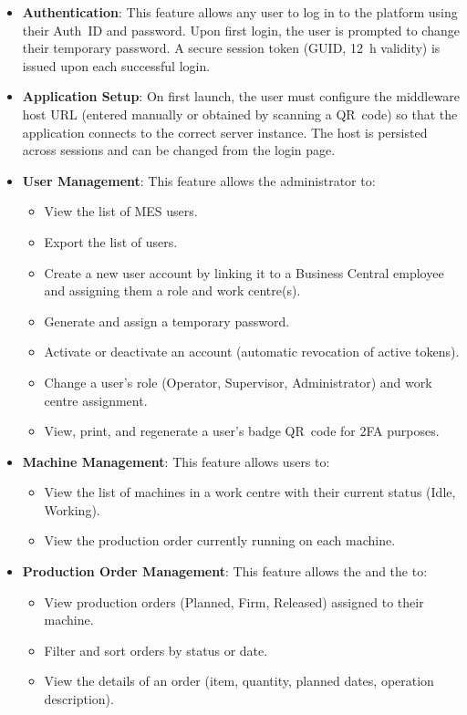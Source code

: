 \begin{itemize}
	\item \textbf{Authentication}: This feature allows any user to log in to the
	      platform using their Auth~ID and password. Upon first login, the user is prompted
	      to change their temporary password. A secure session token (GUID, 12~h validity) is
	      issued upon each successful login.

	
	\item \textbf{Application Setup}: On first launch, the user must configure the
	      middleware host URL (entered manually or obtained by scanning a QR~code) so that
	      the application connects to the correct server instance. The host is persisted
	      across sessions and can be changed from the login page.

	\item \textbf{User Management}: This feature allows the administrator to:
	      \begin{itemize}
	      	\item View the list of MES users.
	      	\item Export the list of users.
	      	\item Create a new user account by linking it to a Business
	      	      Central employee and assigning them a role and work centre(s).
	      	\item Generate and assign a temporary password.
	      	\item Activate or deactivate an account (automatic revocation of active tokens).
	      	\item Change a user's role (Operator, Supervisor, Administrator) and work centre assignment.
	      	\item View, print, and regenerate a user's badge QR~code for 2FA purposes.
	      \end{itemize}

	
	\item \textbf{Machine Management}: This feature allows users to:
	      \begin{itemize}
	      	\item View the list of machines in a work centre with their current status
	      	       (Idle, Working).
	      	\item View the production order currently running on each machine.
	      \end{itemize}

	\item \textbf{Production Order Management}: This feature allows the  and the  to:
	      \begin{itemize}
	      	\item View production orders (Planned, Firm, Released) assigned to their machine.
	      	\item Filter and sort orders by status or date.
	      	\item View the details of an order (item, quantity, planned dates, operation
	      	      description).
	      \end{itemize}


\end{itemize}
